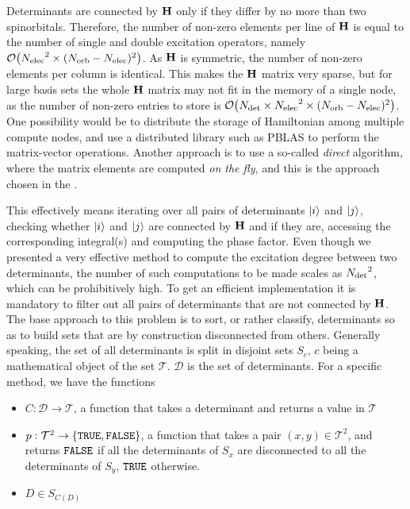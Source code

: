 \documentclass[./thesis.tex]{subfiles}
\begin{document}
Determinants are connected by $\mathbf{H}$ only if they differ by no more than two spinorbitals. Therefore, the number of non-zero elements per line of $\mathbf{H}$ is equal to the number of single and double excitation operators, namely $\order{\Nelec^2 \times (\Norb - \Nelec)^2}$. As $\mathbf{H}$ is symmetric, the number of non-zero elements per column is identical. This makes the $\mathbf{H}$ matrix very sparse, but for large basis sets the whole $\mathbf{H}$ matrix may not fit in the memory of a single node, as the number of non-zero entries to store is $\order{\Ndet \times \Nelec^2 \times (\Norb - \Nelec)^2}$. 
One possibility would be to distribute the storage of Hamiltonian among multiple compute nodes, and use a distributed library such as PBLAS\cite{pblas} to perform the matrix-vector operations. Another approach is to use a so-called \emph{direct} algorithm, where the matrix elements are computed \emph{on the fly}, and this is the approach chosen in the \QP.


This effectively means iterating over all pairs of determinants ${\ket{i}}$ and ${\ket{j}}$, checking whether ${\ket{i}}$ and ${\ket{j}}$ are connected by $\mathbf{H}$ and if they are, accessing the corresponding integral(s) and computing the phase factor.
Even though we presented a very effective method to compute the excitation degree between two determinants, the number of such computations to be made scales as ${N_\text{det}}^2$, which can be prohibitively high. To get an efficient implementation it is mandatory to filter out all pairs of determinants that are not connected by $\mathbf{H}$.
The base approach to this problem is to sort, or rather classify, determinants so as to build sets that are by construction disconnected from others. Generally speaking, the set of all determinants is split in disjoint sets $S_c$, $c$ being a mathematical object of the set $\mathcal{T}$. $\mathcal{D}$ is the set of determinants. For a specific method, we have the functions
\begin{itemize}
	\item
	$C : \mathcal{D} \rightarrow \mathcal{T}$, a function that takes a determinant and returns a value in $\mathcal{T}$
	\item
	$p : \mathcal{T}^2 \rightarrow \{ {\text{\texttt{TRUE}}}, {\text{\texttt{FALSE}}} \}$, a function that takes a pair $(x,y) \in \mathcal{T}^2$, and returns ${\text{\texttt{FALSE}}}$ if all the determinants of $S_x$ are disconnected to all the determinants of $S_y$, ${\text{\texttt{TRUE}}}$ otherwise.
	\item
	$D \in S_{C(D)}$
\end{itemize}  

\end{document}

